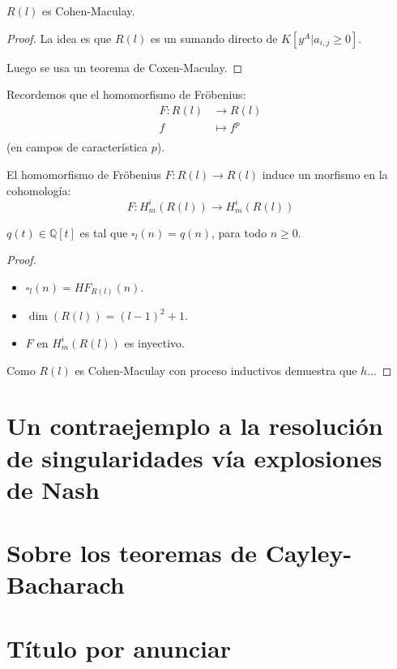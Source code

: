 \documentclass[12pt]{report}
\newcounter{it}
\theoremstyle{largebreak}
\newcommand\cf[3]{\ensuremath{#1:#2\rightarrow#3}}
\begin{document}
    \begin{theor}
        $R(l)$ es Cohen-Maculay.        
    \end{theor}

    \begin{proof}
        La idea es que $R(l)$ es un sumando directo de $K[y^A\Big|a_{ i,j}\geq0]$.

        Luego se usa un teorema de Coxen-Maculay.
    \end{proof}

    Recordemos que el homomorfismo de Fröbenius:
    \begin{equation*}
        \begin{split}
            F:R(l)&\rightarrow R(l)\\
            f&\mapsto f^p\\
        \end{split}
    \end{equation*}
    (en campos de característica $p$).

    \begin{propo}
        El homomorfismo de Fröbenius $\cf{F}{R(l)}{R(l)}$ induce un morfismo en la cohomología:
        \begin{equation*}
            \cf{F}{H_m^i(R(l))}{H_m^i(R(l))}
        \end{equation*}
    \end{propo}

    \begin{theor}
        $q(t)\in\mathbb{Q}[t]$ es tal que $\square_l(n)=q(n)$, para todo $n\geq0$.
    \end{theor}

    \begin{proof}
        \begin{itemize}
            \item $\square_l(n)=HF_{ R(l)}(n)$.
            \item $\dim(R(l))=(l-1)^2+1$.
            \item $F$ en $H_m^i(R(l))$ es inyectivo.
        \end{itemize}
        Como $R(l)$ es Cohen-Maculay con proceso inductivos demuestra que $h$...
    \end{proof}

    \chapter{Un contraejemplo a la resolución de singularidades vía explosiones de Nash}

    \chapter{Sobre los teoremas de Cayley-Bacharach}

    \chapter{Título por anunciar}
\end{document}
